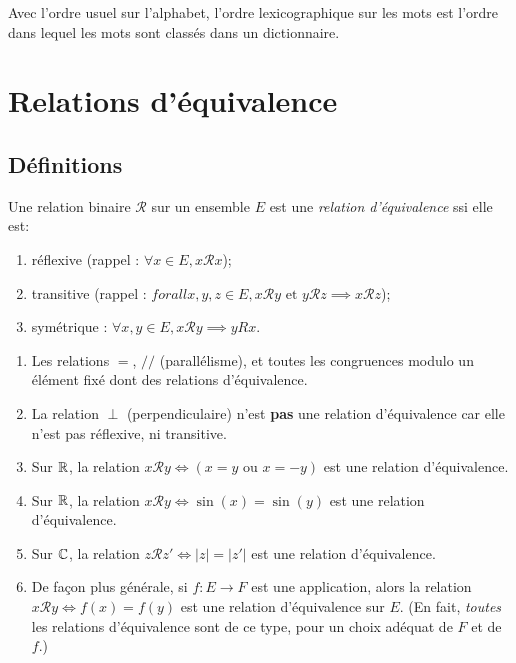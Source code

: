 \begin{exemple}Avec l'ordre usuel sur l'alphabet, l'ordre lexicographique sur les mots est l'ordre dans lequel les mots sont classés dans un dictionnaire.
\end{exemple}



\section{Relations d'équivalence}

\subsection{Définitions}

\begin{definition}
Une relation binaire ${\mathcal R}$ sur un ensemble $E$ est une \emph{relation d'équivalence} ssi elle est:
\begin{enumerate}
\item réflexive (rappel : $\forall x\in E, x{\mathcal R}x$);
\item transitive (rappel : $forallx, y, z\in E, x{\mathcal R}y\text{ et } y{\mathcal R}z \implies x{\mathcal R}z$);
\item symétrique : $\forall x, y\in E, x{\mathcal R}y \implies yRx$.
\end{enumerate}
\end{definition}

\begin{exemples}
\begin{enumerate}[label=\alph*)]
\item Les relations $=$, $//$ (parallélisme), et toutes les congruences modulo un élément fixé dont des relations d'équivalence.
\item La relation $\perp$ (perpendiculaire) n'est \textbf{pas} une relation d'équivalence car elle n'est pas réflexive, ni transitive.
\item Sur $\mathbb{R}$, la relation $x\mathcal R y \iff \left(x=y\text{ ou }x=-y\right)$ est une relation d'équivalence.
\item Sur $\mathbb{R}$, la relation $x\mathcal R y \iff \sin(x)=\sin(y)$ est une relation d'équivalence.
\item Sur $\mathbb{C}$, la relation $z\mathcal R z' \iff |z|=|z'|$ est une relation d'équivalence.
\item De façon plus générale, si $f : E\to F$ est une application, alors la relation $x\mathcal R y \iff f(x)=f(y)$ est une relation d'équivalence sur $E$.
(En fait, \emph{toutes} les relations d'équivalence sont de ce type, pour un choix adéquat de $F$ et de $f$.)
\end{enumerate}
\end{exemples}



